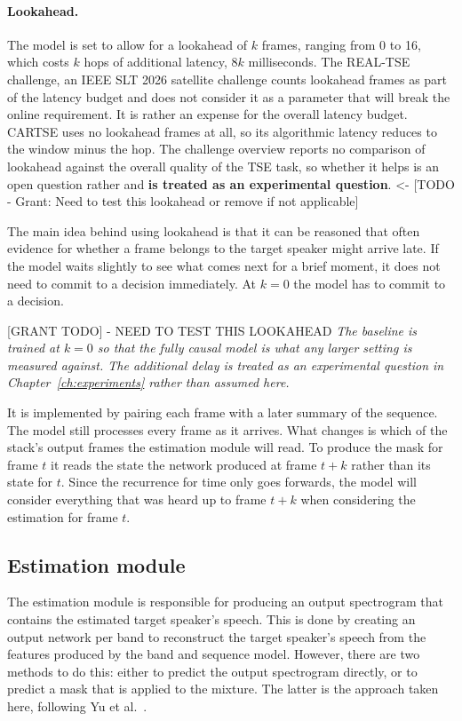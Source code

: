 \paragraph{Lookahead.} The model is set to allow for a lookahead of $k$ frames, ranging from \num{0} to \num{16}, which costs $k$ hops of additional latency, $8k$ milliseconds. The REAL-TSE challenge, an IEEE SLT 2026 satellite challenge \cite{wang2026realtse} counts lookahead frames as part of the latency budget and does not consider it as a parameter that will break the online requirement. It is rather an expense for the overall latency budget. CARTSE \cite{li2026cartse} uses no lookahead frames at all, so its algorithmic latency reduces to the window minus the hop. The challenge overview reports no comparison of lookahead against the overall quality of the TSE task, so whether it helps is an open question rather and \textbf{is treated as an experimental question}. <- [TODO - Grant: Need to test this lookahead or remove if not applicable]


The main idea behind using lookahead is that it can be reasoned that often evidence for whether a frame belongs to the target speaker might arrive late. If the model waits slightly to see what comes next for a brief moment, it does not need to commit to a decision immediately. At $k = 0$ the model has to commit to a decision.

[GRANT TODO] - NEED TO TEST THIS LOOKAHEAD\textit{
The baseline is trained at $k = 0$ so that the fully causal model is what any larger setting is measured against. The additional delay is treated as an experimental question in Chapter~\ref{ch:experiments} rather than assumed here.}

It is implemented by pairing each frame with a later summary of the sequence. The model still processes every frame as it arrives. What changes is which of the stack's output frames the estimation module will read. To produce the mask for frame $t$ it reads the state the network produced at frame $t + k$ rather than its state for $t$. Since the recurrence for time only goes forwards, the model will consider everything that was heard up to frame $t + k$ when considering the estimation for frame $t$.

\subsection{Estimation module}
\label{sec:estimator}

The estimation module is responsible for producing an output spectrogram that contains the estimated target speaker's speech. This is done by creating an output network per band to reconstruct the target speaker's speech from the features produced by the band and sequence model. However, there are two methods to do this: either to predict the output spectrogram directly, or to predict a mask that is applied to the mixture. The latter is the approach taken here, following Yu et al.\ \cite{yu2023high}.

